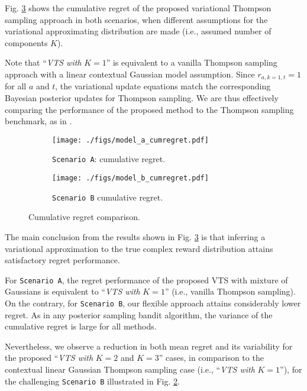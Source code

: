 \documentclass{article}
\newcommand{\ie}{i.e., }
\begin{document}
Fig. \ref{fig:cumregret_comparison} shows the cumulative regret of the proposed variational Thompson sampling approach in both scenarios, when different assumptions for the variational approximating distribution are made (\ie assumed number of components $K$).

Note that ``\textit{VTS with }$K=1$'' is equivalent to a vanilla Thompson sampling approach with a linear contextual Gaussian model assumption. Since $r_{a,k=1,t}=1$ for all $a$ and $t$, the variational update equations match the corresponding Bayesian posterior updates for Thompson sampling. We are thus effectively comparing the performance of the proposed method to the Thompson sampling benchmark, as in \cite{ip-Agrawal2013a}.

\begin{figure}[!h]
	\centering
	\begin{subfigure}[b]{0.49\textwidth}
		\texttt{[image: ./figs/model\_a\_cumregret.pdf]}
		\caption{\texttt{Scenario A}: cumulative regret.}
		\label{fig:model_a_cumregret}
	\end{subfigure}
	\begin{subfigure}[b]{0.49\textwidth}
		\texttt{[image: ./figs/model\_b\_cumregret.pdf]}
		\caption{\texttt{Scenario B} cumulative regret.}
		\label{fig:model_b_cumregret}
	\end{subfigure}
	\caption{Cumulative regret comparison.}
	\label{fig:cumregret_comparison}
\end{figure}

The main conclusion from the results shown in Fig. \ref{fig:cumregret_comparison} is that inferring a variational approximation to the true complex reward distribution attains satisfactory regret performance.

For \texttt{Scenario A}, the regret performance of the proposed VTS with mixture of Gaussians is equivalent to ``\textit{VTS with }$K=1$'' (\ie vanilla Thompson sampling). On the contrary, for \texttt{Scenario B}, our flexible approach attains considerably lower regret. As in any posterior sampling bandit algorithm, the variance of the cumulative regret is large for all methods.

Nevertheless, we observe a reduction in both mean regret and its variability for the proposed ``\textit{VTS with }$K=2$ and $K=3$'' cases, in comparison to the contextual linear Gaussian Thompson sampling case (\ie ``\textit{VTS with }$K=1$''), for the challenging \texttt{Scenario B} illustrated in Fig. \ref{fig:model_b_cumregret}.
\end{document}
